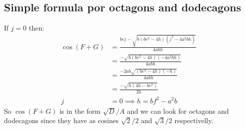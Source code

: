 \documentclass[11pt]{article}
\begin{document}
\subsection{Simple formula por octagons and dodecagons}
If $j = 0$ then:
\begin{align}
\cos{(F+G)} &= \frac{bej - \sqrt{b(be^2-4h)(j^2-4a^2bh)}}{4abh}\nonumber\\
 &= \frac{-\sqrt{b(be^2-4h)(-4a^2bh)}}{4abh}\nonumber\\
 &= \frac{-2ab\sqrt{(be^2-4h)(-h)}}{4abh}\nonumber\\
 &= \frac{-\sqrt{h(4h-be^2)}}{2h}\\
 j &= 0 \implies h = bf^2 - a^2b
\end{align}
So $\cos{(F+G)}$ is in the form $\sqrt{D}/A$ and we can look for octagons and
dodecagons since they have as cosines $\sqrt{2}/2$ and $\sqrt{3}/2$ respectivelly.
\end{document}
